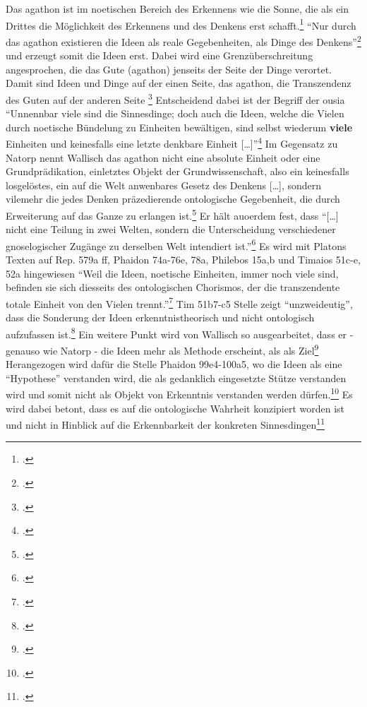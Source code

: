 Das agathon ist im noetischen Bereich des Erkennens wie die Sonne, die als ein Drittes die Möglichkeit des Erkennens und des Denkens erst schafft.\footcite[vgl.][S. 10]{Wallisch} 
\enquote{Nur durch das agathon existieren die Ideen als reale Gegebenheiten, als Dinge des Denkens}\footcite[][S. 11]{Wallisch} und erzeugt somit die Ideen erst. Dabei wird eine Grenzüberschreitung angesprochen, die das Gute (agathon) jenseits der Seite der Dinge verortet. Damit sind Ideen und Dinge auf der einen Seite, das agathon, die Transzendenz des Guten auf der anderen Seite \footcite[vgl.][S. 11]{Wallisch}
Entscheidend dabei ist der Begriff der ousia
\enquote{Unnennbar viele sind die Sinnesdinge; doch auch die Ideen, welche die Vielen durch noetische Bündelung zu Einheiten bewältigen, sind selbst wiederum \textbf{viele} Einheiten und keinesfalls eine letzte denkbare Einheit [\dots]}\footcite[vgl.][S. 12]{Wallisch}
Im Gegensatz zu Natorp nennt Wallisch das agathon nicht eine absolute Einheit oder eine Grundprädikation, einletztes Objekt der Grundwissenschaft, also ein keinesfalls losgelöstes, ein auf die Welt anwenbares Gesetz des Denkens [\dots], sondern vilemehr die jedes Denken präzedierende ontologische Gegebenheit, die durch Erweiterung auf das Ganze zu erlangen ist.\footcite[vgl.][S. 14]{Wallisch}
Er hält auoerdem fest, dass \enquote{[\dots] nicht eine Teilung in zwei Welten, sondern die Unterscheidung verschiedener gnoselogischer Zugänge zu derselben Welt intendiert ist.}\footcite[vgl.][S. 15]{Wallisch}
Es wird mit Platons Texten auf Rep. 579a ff, Phaidon 74a-76e, 78a, Philebos 15a,b und Timaios 51c-e, 52a hingewiesen
\enquote{Weil die Ideen, noetische Einheiten, immer noch viele sind, befinden sie sich diesseits des ontologischen Chorismos, der die transzendente totale Einheit von den Vielen trennt.}\footcite[][S. 17]{Wallisch}
Tim 51b7-c5 Stelle zeigt \enquote{unzweideutig}, dass die Sonderung der Ideen erkenntnistheorisch und nicht ontologisch aufzufassen ist.\footcite[vgl.][S. 19]{Wallisch}
Ein weitere Punkt wird von Wallisch so ausgearbeitet, dass er - genauso wie Natorp - die Ideen mehr als Methode erscheint, als als Ziel\footcite[vgl.][S. 26]{Wallisch} Herangezogen wird dafür die Stelle Phaidon 99e4-100a5, wo die Ideen als eine \enquote{Hypothese} verstanden wird, die als gedanklich eingesetzte Stütze verstanden wird und somit nicht als Objekt von Erkenntnis verstanden werden dürfen.\footcite[vgl.][S. 26]{Wallisch} Es wird dabei betont, dass es auf die ontologische Wahrheit konzipiert worden ist und nicht in Hinblick auf die Erkennbarkeit der konkreten Sinnesdingen\footcite[vgl.][S. 27]{Wallisch}

